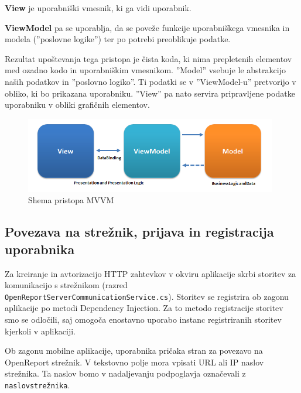\documentclass[a4paper, 12pt]{book}
\begin{document}
\textbf{View} je uporabniški vmesnik, ki ga vidi uporabnik.

\textbf{ViewModel} pa se uporablja, da se poveže funkcije uporabniškega vmesnika in modela (''poslovne logike'') ter po potrebi preoblikuje podatke.

Rezultat upoštevanja tega pristopa je čista koda, ki nima prepletenih elementov med ozadno kodo in uporabniškim vmesnikom.
''Model'' vsebuje le abstrakcijo naših podatkov in ''poslovno logiko''.
Ti podatki se v ''ViewModel-u'' pretvorijo v obliko, ki bo prikazana uporabniku.
''View'' pa nato servira pripravljene podatke uporabniku v obliki grafičnih elementov.

\begin{figure}[H]
\begin{center}
\includegraphics[width=11cm]{mvvm}
\end{center}
	\caption{Shema pristopa MVVM}
\label{mvvm}
\end{figure}

\subsection{Povezava na strežnik, prijava in registracija uporabnika}

Za kreiranje in avtorizacijo HTTP zahtevkov v okviru aplikacije skrbi storitev za komunikacijo s strežnikom (razred \\\texttt{OpenReportServerCommunicationService.cs}).
Storitev se registrira ob zagonu aplikacije po metodi Dependency Injection.
Za to metodo registracije storitev smo se odločili, saj omogoča enostavno uporabo instanc registriranih storitev kjerkoli v aplikaciji.

Ob zagonu mobilne aplikacije, uporabnika pričaka stran za povezavo na OpenReport strežnik.
V tekstovno polje mora vpisati URL ali IP naslov strežnika.
Ta naslov bomo v nadaljevanju podpoglavja označevali z \texttt{naslovstrežnika}.

\end{document}

